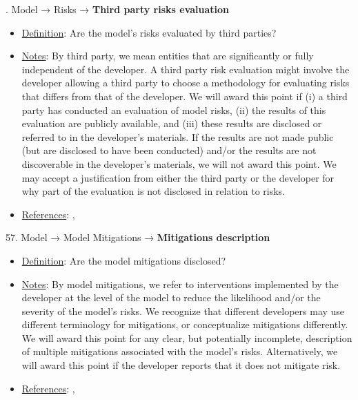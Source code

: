 . Model → Risks → \textbf{Third party risks evaluation}
\vspace{-\parskip}
\begin{itemize}
	\item
	\underline{Definition}: Are the model’s risks evaluated by third parties?
	\item
	\underline{Notes}: By third party, we mean entities that are significantly or fully independent of the developer. A third party risk evaluation might involve the developer allowing a third party to choose a methodology for evaluating risks that differs from that of the developer. We will award this point if (i) a third party has conducted an evaluation of model risks, (ii) the results of this evaluation are publicly available, and (iii) these results are disclosed or referred to in the developer’s materials. If the results are not made public (but are disclosed to have been conducted) and/or the results are not discoverable in the developer’s materials, we will not award this point. We may accept a justification from either the third party or the developer for why part of the evaluation is not disclosed in relation to risks.
	\item
	\underline{References}: \citet{raji2022audit}, \citet{weidinger2021ethical}
\end{itemize}


57. Model → Model Mitigations → \textbf{Mitigations description}
\vspace{-\parskip}
\begin{itemize}
	\item
	\underline{Definition}: Are the model mitigations disclosed?
	\item
	\underline{Notes}: By model mitigations, we refer to interventions implemented by the developer at the level of the model to reduce the likelihood and/or the severity of the model’s risks. We recognize that different developers may use different terminology for mitigations, or conceptualize mitigations differently. We will award this point for any clear, but potentially incomplete, description of multiple mitigations associated with the model's risks. Alternatively, we will award this point if the developer reports that it does not mitigate risk.
	\item
	\underline{References}: \citet{solaiman2023evaluating}, \citet{weidinger2021ethical}
\end{itemize}


